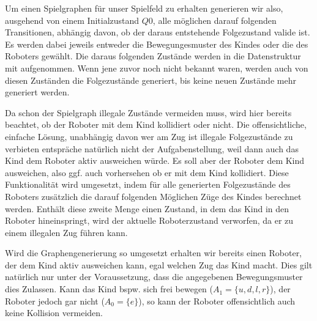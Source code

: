 Um einen Spielgraphen für unser Spielfeld zu erhalten generieren wir also, ausgehend von einem Initialzustand $Q0$, alle möglichen darauf folgenden Transitionen, abhängig davon, ob der daraus entstehende Folgezustand valide ist. Es werden dabei jeweils entweder die Bewegungesmuster des Kindes oder die des Roboters gewählt. Die daraus folgenden Zustände werden in die Datenstruktur mit aufgenommen. Wenn jene zuvor noch nicht bekannt waren, werden auch von diesen Zuständen die Folgezustände generiert, bis keine neuen Zustände mehr generiert werden. 

Da schon der Spielgraph illegale Zustände vermeiden muss, wird hier bereits beachtet, ob der Roboter mit dem Kind kollidiert oder nicht. Die offensichtliche, einfache Lösung, unabhängig davon wer am Zug ist illegale Folgezustände zu verbieten entspräche natürlich nicht der Aufgabenstellung, weil dann auch das Kind dem Roboter aktiv ausweichen würde. Es soll aber der Roboter dem Kind ausweichen, also ggf. auch vorhersehen ob er mit dem Kind kollidiert. Diese Funktionalität wird umgesetzt, indem für alle generierten Folgezustände des Roboters zusätzlich die darauf folgenden Möglichen Züge des Kindes berechnet werden. Enthält diese zweite Menge einen Zustand, in dem das Kind in den Roboter hineinspringt, wird der aktuelle Roboterzustand verworfen, da er zu einem illegalen Zug führen kann.

Wird die Graphengenerierung so umgesetzt erhalten wir bereits einen Roboter, der dem Kind aktiv ausweichen kann, egal welchen Zug das Kind macht. Dies gilt natürlich nur unter der Voraussetzung, dass die angegebenen Bewegungsmuster dies Zulassen. Kann das Kind bspw. sich frei bewegen ($A_1 = \{u,d,l,r\}$), der Roboter jedoch gar nicht ($A_0 = \{e\}$), so kann der Roboter offensichtlich auch keine Kollision vermeiden.


